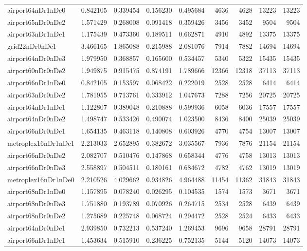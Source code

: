 \begin{longtable}{|l|r|r|r|r|r|r|r|r|}
airport64nDr1nDe0 & 0.842105 & 0.339454 & 0.156230 & 0.495684 & 4636 & 4628 & 13223 & 13223 \\
airport65nDr0nDe2 & 1.571429 & 0.268008 & 0.091418 & 0.359426 & 3456 & 3452 & 9504 & 9504 \\
airport63nDr1nDe1 & 1.175439 & 0.473360 & 0.189511 & 0.662871 & 4910 & 4892 & 13375 & 13375 \\
grid22nDr0nDe1 & 3.466165 & 1.865088 & 0.215988 & 2.081076 & 7914 & 7882 & 14694 & 14694 \\
airport64nDr0nDe3 & 1.979950 & 0.368857 & 0.165600 & 0.534457 & 5340 & 5322 & 15435 & 15435 \\
airport60nDr0nDe2 & 1.949875 & 0.915475 & 0.874191 & 1.789666 & 12366 & 12318 & 37113 & 37113 \\
airport66nDr1nDe0 & 0.842105 & 0.153597 & 0.068422 & 0.222019 & 2528 & 2528 & 6414 & 6414 \\
airport63nDr0nDe2 & 1.781955 & 0.713761 & 0.333912 & 1.047673 & 7288 & 7256 & 20725 & 20725 \\
airport64nDr1nDe1 & 1.122807 & 0.389048 & 0.210888 & 0.599936 & 6058 & 6036 & 17557 & 17557 \\
airport64nDr0nDe2 & 1.498747 & 0.533426 & 0.490074 & 1.023500 & 8436 & 8400 & 25039 & 25039 \\
airport66nDr0nDe1 & 1.654135 & 0.463118 & 0.140808 & 0.603926 & 4770 & 4754 & 13007 & 13007 \\
metroplex16nDr1nDe1 & 2.213033 & 2.652895 & 0.382672 & 3.035567 & 7936 & 7876 & 21154 & 21154 \\
airport66nDr0nDe2 & 2.082707 & 0.510476 & 0.147868 & 0.658344 & 4776 & 4758 & 13013 & 13013 \\
airport66nDr0nDe3 & 2.558897 & 0.504511 & 0.180161 & 0.684672 & 4782 & 4762 & 13019 & 13019 \\
metroplex16nDr1nDe0 & 2.210526 & 4.029662 & 0.934826 & 4.964488 & 11454 & 11362 & 31843 & 31843 \\
airport68nDr1nDe0 & 1.157895 & 0.078240 & 0.026295 & 0.104535 & 1574 & 1573 & 3671 & 3671 \\
airport68nDr0nDe3 & 1.751880 & 0.193789 & 0.070926 & 0.264715 & 2534 & 2528 & 6439 & 6439 \\
airport68nDr0nDe2 & 1.275689 & 0.225748 & 0.068724 & 0.294472 & 2528 & 2524 & 6433 & 6433 \\
airport64nDr0nDe1 & 2.939850 & 0.732213 & 0.537240 & 1.269453 & 9696 & 9658 & 28791 & 28791 \\
airport66nDr1nDe1 & 1.453634 & 0.515910 & 0.236225 & 0.752135 & 5144 & 5120 & 14073 & 14073 \\

\end{longtable}
